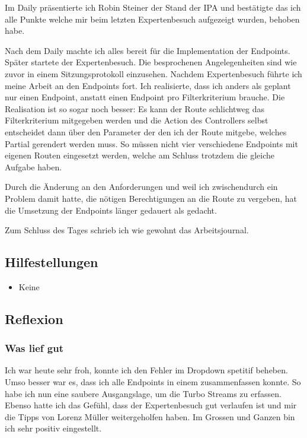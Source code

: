 Im Daily präsentierte ich Robin Steiner der Stand der IPA und bestätigte das ich alle Punkte welche mir beim letzten Expertenbesuch aufgezeigt wurden, behoben habe.

Nach dem Daily machte ich alles bereit für die Implementation der Endpoints. Später startete der Expertenbesuch. Die besprochenen Angelegenheiten sind wie zuvor in einem Sitzungsprotokoll
einzusehen. Nachdem Expertenbesuch führte ich meine Arbeit an den Endpoints fort. Ich realisierte, dass ich anders als geplant nur einen Endpoint, anstatt einen Endpoint pro Filterkriterium brauche.
Die Realisation ist so sogar noch besser: Es kann der Route schlichtweg das Filterkriterium mitgegeben werden und die Action des Controllers selbst entscheidet dann über den Parameter der den ich der Route
mitgebe, welches Partial gerendert werden muss. So müssen nicht vier verschiedene Endpoints mit eigenen Routen eingesetzt werden, welche am Schluss trotzdem die gleiche Aufgabe haben.

Durch die Änderung an den Anforderungen und weil ich zwischendurch ein Problem damit hatte, die nötigen Berechtigungen an die Route zu vergeben, hat die Umsetzung der Endpoints länger gedauert
als gedacht.

Zum Schluss des Tages schrieb ich wie gewohnt das Arbeitsjournal.

\subsection*{Hilfestellungen}
\begin{itemize}
    \item Keine
\end{itemize}

\subsection*{Reflexion}

\subsubsection*{Was lief gut}
Ich war heute sehr froh, konnte ich den Fehler im Dropdown spetitif beheben. Umso besser war es, dass ich alle Endpoints in einem zusammenfassen konnte. 
So habe ich nun eine saubere Ausgangslage, um die Turbo Streams zu erfassen. Ebenso hatte ich das Gefühl, dass der Expertenbesuch gut verlaufen ist und mir 
die Tipps von Lorenz Müller weitergeholfen haben. Im Grossen und Ganzen bin ich sehr positiv eingestellt.

